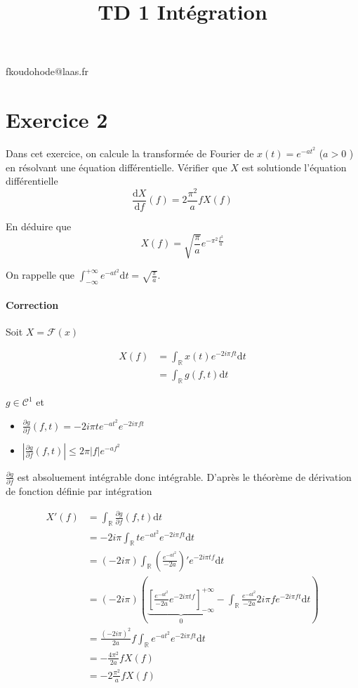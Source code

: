 \documentclass{article}
\title{TD 1 Intégration}
\renewcommand{\d}{\mathrm{d}}
\newcommand{\cF}{\mathcal{F}}
\newcommand{\R}{\mathbb{R}}
\newcommand{\cC}{\mathcal{C}}
\begin{document}
\maketitle

fkoudohode@laas.fr

\section{Exercice 2}

Dans cet exercice, on calcule la transformée de Fourier de $x(t) = e^{-at^2}$ ($a>0$ ) en résolvant une équation différentielle.
Vérifier que $X$ est solutionde l'équation différentielle
\[
	\frac{\d X}{\d f}(f) = 2 \frac{\pi^2}{a} fX(f)
\] 

En déduire que 
\[
	X(f) = \sqrt{\frac{\pi}{a}} e^{-\pi^2 \frac{f^2}{a}}
\] 
	

On rappelle que $\int_{-\infty}^{+\infty} e^{-at^2} \d t = \sqrt{\frac{\pi}{a}} $.

\paragraph{Correction}

Soit $X = \cF(x)$

\begin{align*}
	X(f)  &= \int_\R x(t) e^{-2i\pi ft} \d t \\
	&= \int_\R g(f, t) \d t
\end{align*}

$g \in \cC^1$ et

\begin{itemize}
	\item $\frac{\partial g}{\partial f}(f, t) = -2i\pi t e^{-at^2} e^{-2i\pi ft}$
	\item $\left| \frac{\partial g}{\partial f}(f, t) \right| \le  2\pi |f| e^{-af^2}$
\end{itemize}

$ \frac{\partial g}{\partial f}  $ est absoluement intégrable donc intégrable. D'après le théorème de dérivation de fonction définie par intégration

\begin{align*}
	X'(f) &= \int_\R \frac{\partial g}{\partial f}(f, t) \d t \\
	&= -2i\pi \int_\R t e^{-at^2} e^{-2i\pi ft} \d t\\
	&= (-2i\pi) \int_\R \left( \frac{e^{-at^2}}{-2a} \right) ' e^{-2i\pi tf} \d t \\
	&= (-2i\pi) \left( \underbrace{\left[ \frac{e^{-at^2}}{-2a} e^{-2i\pi tf} \right]_{-\infty}^{+\infty}}_{0} - \int_\R \frac{e^{-at^2}}{-2a} 2i\pi f e^{-2i\pi ft} \d t \right)  \\
	&= \frac{(-2i\pi)^2}{2a} f \int_\R e^{-at^2} e^{-2i\pi ft} \d t\\
	&= - \frac{4\pi^2}{2a} f X(f) \\
	&= -2 \frac{\pi^2}{a} f X(f) \\
\end{align*}
\end{document}

